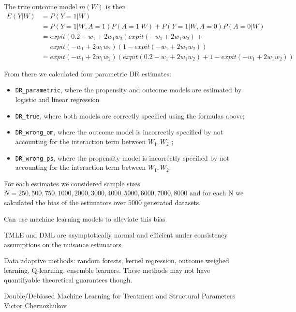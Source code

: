 \documentclass[12pt,twoside]{article}
\begin{document}
The true outcome model $m(W)$ is then 
\begin{align*}
    E(Y|W) &= P(Y = 1|W) \\
    & = P(Y = 1 |W, A = 1)P(A = 1|W) +  P(Y = 1 |W, A = 0)P(A = 0|W) \\
    & = expit(0.2 - w_1 + 2w_1w_2)expit(-w_1+2w_1w_2) + \\
    & \phantom{={}} expit(-w_1+2w_1w_2)(1-expit(-w_1 + 2w_1w_2)) \\
    & = expit(-w_1 + 2w_1w_2)(expit(0.2 - w_1 + 2w_1w_2) + 1 - expit(-w_1 + 2w_1w_2))
\end{align*}

From there we calculated four parametric DR estimates: 
\begin{itemize}
    \item \texttt{DR\_parametric}, where the propensity and outcome models are estimated by logistic and linear regression
    \item \texttt{DR\_true}, where both models are correctly specified using the formulas above;
    \item \texttt{DR\_wrong\_om}, where the outcome model is incorrectly specified by not accounting for the interaction term between $W_1, W_2$ ;
    \item \texttt{DR\_wrong\_ps}, where the propensity model is incorrectly specified by not accounting for the interaction term between $W_1, W_2$.
\end{itemize}

For each estimates we considered sample sizes $N= 250,500,750,1000,2000,3000,4000,5000,6000,7000,8000$ and for each N we calculated the bias of the estimators over 5000 generated datasets.








Can use machine learning models to alleviate this bias.

TMLE and DML are asymptotically normal and efficient under consistency assumptions on the nuisance estimators

Data adaptive methods: random forests, kernel regression, outcome weighed learning, Q-learning, ensemble learners. These methods may not have quantifyable theoretical guarantees though.

Double/Debiased Machine Learning for Treatment
and Structural Parameters
Victor Chernozhukov









\end{document}
